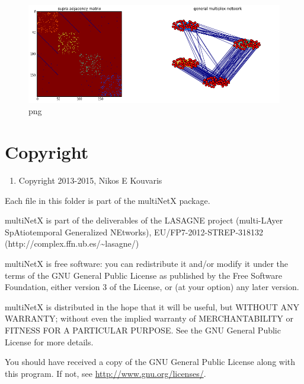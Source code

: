 \documentclass[]{article}
\begin{document}
\begin{figure}[htbp]
\centering
\includegraphics{output_57_0.png}
\caption{png}
\end{figure}

\section{Copyright}\label{copyright}

\begin{enumerate}
\def\labelenumi{(\Alph{enumi})}
\setcounter{enumi}{2}
\itemsep1pt\parskip0pt
\item
  Copyright 2013-2015, Nikos E Kouvaris
\end{enumerate}

Each file in this folder is part of the multiNetX package.

multiNetX is part of the deliverables of the LASAGNE project
(multi-LAyer SpAtiotemporal Generalized NEtworks),
EU/FP7-2012-STREP-318132
(http://complex.ffn.ub.es/\textasciitilde{}lasagne/)

multiNetX is free software: you can redistribute it and/or modify it
under the terms of the GNU General Public License as published by the
Free Software Foundation, either version 3 of the License, or (at your
option) any later version.

multiNetX is distributed in the hope that it will be useful, but WITHOUT
ANY WARRANTY; without even the implied warranty of MERCHANTABILITY or
FITNESS FOR A PARTICULAR PURPOSE. See the GNU General Public License for
more details.

You should have received a copy of the GNU General Public License along
with this program. If not, see \url{http://www.gnu.org/licenses/}.
\end{document}
